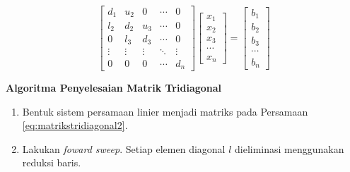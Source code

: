 \documentclass[]{book}
\providecommand{\tightlist}{%
  \setlength{\itemsep}{0pt}\setlength{\parskip}{0pt}}
\theoremstyle{definition}
\theoremstyle{definition}
\theoremstyle{definition}
\theoremstyle{remark}
\begin{document}
\begin{equation}
\begin{bmatrix}
     d_{1} & u_{2} & 0       &\cdots& 0                 \\[0.3em]
     l_{2} & d_{2} & u_{3} &\cdots& 0             \\[0.3em]
     0       & l_{3} & d_{3} &\cdots& 0             \\[0.3em]
     \vdots  & \vdots  & \vdots  &\ddots& \vdots            \\[0.3em]
     0       & 0       & 0       &\cdots& d_{n}
     \end{bmatrix}
\begin{bmatrix}
     x_1                                          \\[0.3em]
     x_2                                          \\[0.3em]
     x_3                                          \\[0.3em]
     \cdots                                       \\[0.3em]
     x_n                                       
     \end{bmatrix}
= \begin{bmatrix}
     b_1                                          \\[0.3em]
     b_2                                          \\[0.3em]
     b_3                                          \\[0.3em]
     \cdots                                       \\[0.3em]
     b_n                                       
     \end{bmatrix}
  \label{eq:matrikstridiagonal2}
\end{equation}

\textbf{Algoritma Penyelesaian Matrik Tridiagonal}

\begin{enumerate}
\def\labelenumi{\arabic{enumi}.}
\tightlist
\item
  Bentuk sistem persamaan linier menjadi matriks pada Persamaan \eqref{eq:matrikstridiagonal2}.
\item
  Lakukan \emph{foward sweep}. Setiap elemen diagonal \(l\) dieliminasi menggunakan reduksi baris.
\end{enumerate}
\end{document}
